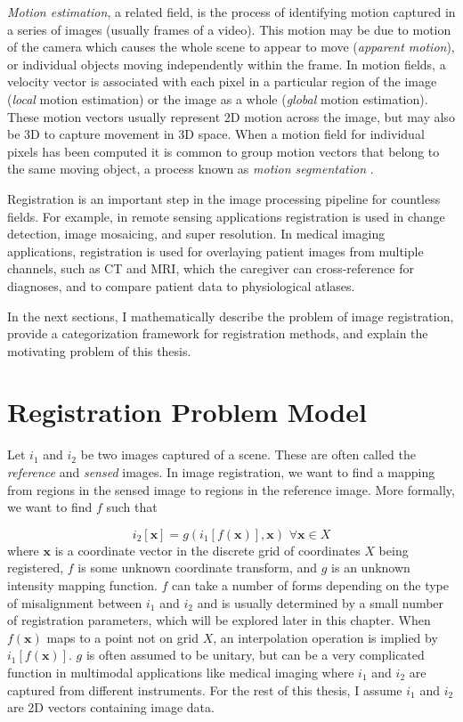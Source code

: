 \documentclass[tocnosub,noragright,centerchapter,12pt]{uiucecethesis09}
\begin{document}
\emph{Motion estimation}, a related field, is the process of identifying motion captured in a series of images (usually frames of a video).  This motion may be due to motion of the camera which causes the whole scene to appear to move (\emph{apparent motion}), or individual objects moving independently within the frame.  In motion fields, a velocity vector is associated with each pixel in a particular region of the image (\emph{local} motion estimation) or the image as a whole (\emph{global} motion estimation).  These motion vectors usually represent 2D motion across the image, but may also be 3D to capture movement in 3D space.  When a motion field for individual pixels has been computed it is common to group motion vectors that belong to the same moving object, a process known as \emph{motion segmentation} \cite{konrad}.

Registration is an important step in the image processing pipeline for countless fields.  For example, in remote sensing applications registration is used in change detection, image mosaicing, and super resolution.  In medical imaging applications, registration is used for overlaying patient images from multiple channels, such as CT and MRI, which the caregiver can cross-reference for diagnoses, and to compare patient data to physiological atlases.

In the next sections, I mathematically describe the problem of image registration, provide a categorization framework for registration methods, and explain the motivating problem of this thesis.

\section{Registration Problem Model}

Let $i_1$ and $i_2$ be two images captured of a scene.  These are often called the \emph{reference} and \emph{sensed} images.  In image registration, we want to find a mapping from regions in the sensed image to regions in the reference image.  More formally, we want to find $f$ such that

$$
i_2[\bm{x}] = g(i_1[f(\bm{x})], \bm{x}) \,\, \forall \bm{x} \in X
$$
where $\bm{x}$ is a coordinate vector in the discrete grid of coordinates $X$ being registered, $f$ is some unknown coordinate transform, and $g$ is an unknown intensity mapping function.  $f$ can take a number of forms depending on the type of misalignment between $i_1$ and $i_2$ and is usually determined by a small number of registration parameters, which will be explored later in this chapter.  When $f(\bm{x})$ maps to a point not on grid $X$, an interpolation operation is implied by $i_1[f(\bm{x})]$.  $g$ is often assumed to be unitary, but can be a very complicated function in multimodal applications like medical imaging where $i_1$ and $i_2$ are captured from different instruments.  For the rest of this thesis, I assume $i_1$ and $i_2$ are 2D vectors containing image data.
\end{document}
